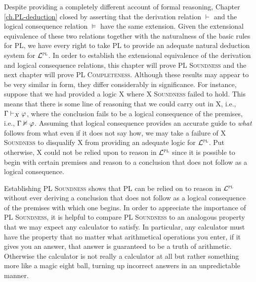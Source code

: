 Despite providing a completely different account of formal reasoning, Chapter \ref{ch.PL-deduction} closed by asserting that the derivation relation $\vdash$ and the logical consequence relation $\vDash$ have the same extension.  
Given the extensional equivalence of these two relations together with the naturalness of the basic rules for PL, we have every right to take PL to provide an adequate natural deduction system for $\mathcal{L}^{\textsc{pl}}$. %
In order to establish the extensional equivalence of the derivation and logical consequence relations, this chapter will prove \textsc{PL Soundness} and the next chapter will prove \textsc{PL Completeness}.
Although these results may appear to be very similar in form, they differ considerably in significance.
For instance, suppose that we had provided a logic X where \textsc{X Soundness} failed to hold. %
This means that there is some line of reasoning that we could carry out in X, i.e., $\Gamma \vdash_X \varphi$, where the conclusion fails to be a logical consequence of the premises, i.e., $\Gamma \nvDash \varphi$.
Assuming that logical consequence provides an accurate guide to \textit{what} follows from what even if it does not say how, we may take a failure of \textsc{X Soundness} to disqualify X from providing an adequate logic for $\mathcal{L}^{\textsc{pl}}$.
Put otherwise, X could not be relied upon to reason in $\mathcal{L}^{\textsc{pl}}$ since it is possible to begin with certain premises and reason to a conclusion that does not follow as a logical consequence.

Establishing \textsc{PL Soundness} shows that PL can be relied on to reason in $\mathcal{L}^{\textsc{pl}}$ without ever deriving a conclusion that does not follow as a logical consequence of the premises with which one begins. 
In order to appreciate the importance of \textsc{PL Soundness}, it is helpful to compare \textsc{PL Soundness} to an analogous property that we may expect any calculator to satisfy.
In particular, any calculator must have the property that no matter what arithmetical operations you enter, if it gives you an answer, that answer is guaranteed to be a truth of arithmetic.
Otherwise the calculator is not really a calculator at all but rather something more like a magic eight ball, turning up incorrect answers in an unpredictable manner.

